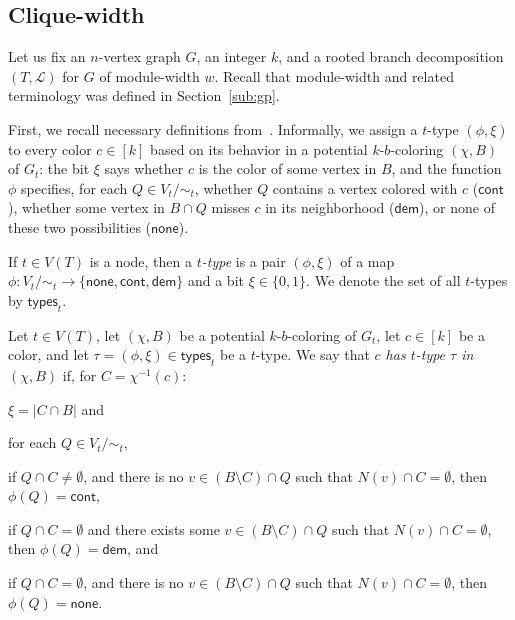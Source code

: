 \documentclass[runningheads, envcountsame]{llncs}
\newcommand{\ca}{\mathcal}
\newcommand\cnone{\mathsf{none}}
\newcommand\ccontains{\mathsf{cont}}
\newcommand\cdemand{\mathsf{dem}}
\newcommand\ctypes{\mathsf{types}}
\begin{document}
\subsection{Clique-width}

Let us fix an $n$-vertex graph $G$, an integer $k$, and a rooted branch decomposition $(T, \ca L)$ for $G$ of module-width $w$.
Recall that module-width and related terminology was defined in Section~\ref{sub:gp}.

First, we recall necessary definitions from~\cite{JaffkeLL24}.
Informally, we assign a $t$-type $(\phi, \xi)$ to every color $c \in [k]$ based on its behavior in a potential $k$-$b$-coloring $(\chi, B)$ of $G_t$: the bit $\xi$ says whether $c$ is the color of some vertex in $B$, and the function $\phi$ specifies, for each $Q \in V_t/{\sim_t}$, whether $Q$ contains a vertex colored with $c$ ($\ccontains$), whether some vertex in $B \cap Q$ misses $c$ in its neighborhood ($\cdemand$), or none of these two possibilities ($\cnone$).

\begin{definition}
If $t \in V(T)$ is a node, then a \emph{$t$-type} is a pair $(\phi, \xi)$ of a map $\phi \colon V_t/{\sim_t} \to \{\cnone,\ccontains,\cdemand\}$ and a bit $\xi \in \{0, 1\}$. We denote the set of all $t$-types by $\ctypes_t$.
\end{definition}

\begin{definition}\label{def:cw-has-type}
Let $t \in V(T)$, let $(\chi, B)$ be a potential $k$-$b$-coloring of $G_t$, let $c \in [k]$ be a color, and let $\tau = (\phi, \xi) \in \ctypes_t$ be a $t$-type. We say that \emph{$c$ has $t$-type $\tau$ in $(\chi, B)$} if, for $C = \chi^{-1}(c)$:
\begin{compactenum}
\item $\xi = |C \cap B|$ and
\item for each $Q \in V_t/{\sim_t}$,
\begin{compactenum}
\item if $Q \cap C \neq \emptyset$, and there is no $v \in (B \setminus C) \cap Q$ 	such that $N(v) \cap C = \emptyset$, then $\phi(Q) = \ccontains$,
\item if $Q \cap C = \emptyset$ and there exists some $v \in (B \setminus C) \cap Q$ such that $N(v) \cap C = \emptyset$, then $\phi(Q) = \cdemand$, and
\item if $Q \cap C = \emptyset$, and there is no $v \in (B \setminus C) \cap Q$ such that $N(v) \cap C = \emptyset$, then $\phi(Q) = \cnone$.
\end{compactenum}
\end{compactenum}
\end{definition}
\end{document}
